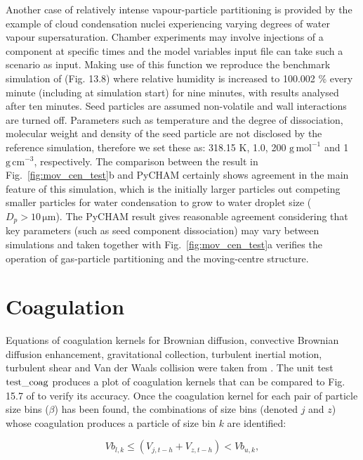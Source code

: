 \documentclass[gmd, manuscript]{copernicus}
\begin{document}
Another case of relatively intense vapour-particle partitioning is provided by the example of cloud condensation nuclei experiencing varying degrees of water vapour supersaturation.  Chamber experiments may involve injections of a component at specific times and the model variables input file can take such a scenario as input.  Making use of this function we reproduce the benchmark simulation of \citet{Jacobson2005} (Fig. 13.8) where relative humidity is increased to 100.002 \% every minute (including at simulation start) for nine minutes, with results analysed after ten minutes.  Seed particles are assumed non-volatile and wall interactions are turned off.  Parameters such as temperature and the degree of dissociation, molecular weight and density of the seed particle are not disclosed by the reference simulation, therefore we set these as: 318.15 K, 1.0, 200 $\mathrm{g\,mol^{-1}}$ and 1 $\mathrm{g\,cm^{-3}}$, respectively.  The comparison between the \citet{Jacobson2005} result in Fig.~\ref{fig:mov_cen_test}b and PyCHAM certainly shows agreement in the main feature of this simulation, which is the initially larger particles out competing smaller particles for water condensation to grow to water droplet size ($D_{p}>10\, \mathrm{\mu m}$).  The PyCHAM result gives reasonable agreement considering that key parameters (such as seed component dissociation) may vary between simulations and taken together with Fig.~\ref{fig:mov_cen_test}a verifies the operation of gas-particle partitioning and the moving-centre structure.

\section{Coagulation}\label{sec:coag}

Equations of coagulation kernels for Brownian diffusion, convective Brownian diffusion enhancement, gravitational collection, turbulent inertial motion, turbulent shear and Van der Waals collision were taken from \citet{Jacobson2005}.  The unit test $\rm{test\_coag}$ produces a plot of coagulation kernels that can be compared to Fig. 15.7 of \citet{Jacobson2005} to verify its accuracy.  Once the coagulation kernel for each pair of particle size bins ($\beta$) has been found, the combinations of size bins (denoted $j$ and $z$) whose coagulation produces a particle of size bin $k$ are identified:

 \begin{equation} \label{eq:coag2}
Vb_{l,k} \leq (V_{j,t-h}+V_{z,t-h}) < Vb_{u,k},
\end{equation}
\end{document}
